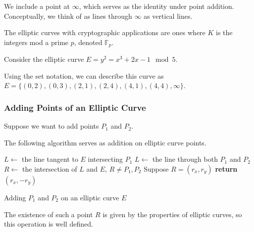 We include a point at
$\infty$, which serves as the identity under point addition.
Conceptually, we think of as lines through $\infty$
as vertical lines.

The elliptic curves with cryptographic applications are ones where $K$ is the integers
mod a prime $p$, denoted $\mathbb{F}_p$.

\begin{example}
    Consider the elliptic curve $E = y^2 = x^3+2x-1 \mod 5$.

    Using the set notation, we can describe this curve as
    $E = \{(0 ,2 ),(0,3),(2,1),(2 ,4 ),(4,1),(4,4), \infty\}$.
\end{example}




\subsubsection{Adding Points of an Elliptic Curve}
Suppose we want to add points $P_1$ and $P_2$.

The following algorithm serves as addition on elliptic curve points.
\begin{algorithm}
    \begin{algorithmic}
        \State $L \gets$ the line tangent to $E$ intersecting $P_1$
        \Else
        \State $L \gets$ the line through both $P_1$ and $P_2$
        \EndIf
        \State $R \gets$ the intersection of $L$ and $E$, $R \neq P_1, P_2$
        \State Suppose $R = (r_x, r_y)$
        \State \textbf{return} $(r_x, -r_y)$
        \EndProcedure
    \end{algorithmic}
    \caption{Adding $P_1$ and $P_2$ on an elliptic curve $E$}
    \label{euclid}
\end{algorithm}

The existence of such a point $R$ is given by the properties of elliptic curves,
so this operation is well defined.

